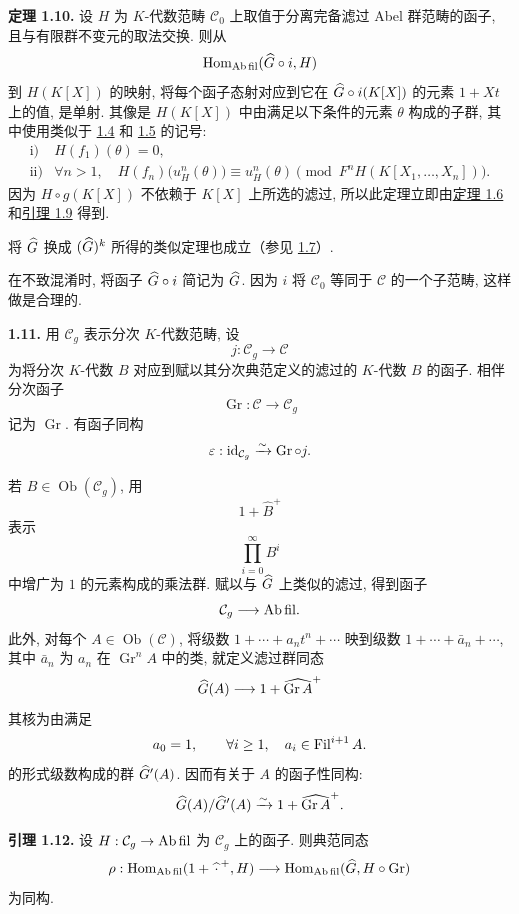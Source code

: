 \textbf{定理 1.10.} 设 \(H\) 为 \(K\)-代数范畴 \(\mathcal C_0\) 上取值于分离完备滤过 Abel 群范畴的函子, 且与有限群不变元的取法交换. 则从
\[
  \operatorname{Hom}_{\mathrm{Ab\,fil}}(\widehat G\circ i,H)
\]
到 \(H(K[X])\) 的映射, 将每个函子态射对应到它在 \(\widehat G\circ i(K[X])\) 的元素 \(1+Xt\) 上的值, 是单射. 其像是 \(H(K[X])\) 中由满足以下条件的元素 \(\theta\) 构成的子群, 其中使用类似于 \hyperlink{sga6.e05.para.1-4}{1.4} 和 \hyperlink{sga6.e05.para.1-5}{1.5} 的记号:
\[
\begin{array}{ll}
\text{i)}& H(f_1)(\theta)=0,\\[0.3em]
\text{ii)}& \forall n>1,\quad
 H(f_n)\bigl(u_H^n(\theta)\bigr)\equiv u_H^n(\theta)
 \pmod{F^nH(K[X_1,\ldots,X_n])}.
\end{array}
\]
因为 \(H\circ g(K[X])\) 不依赖于 \(K[X]\) 上所选的滤过, 所以此定理立即由\hyperlink{sga6.e05.thm.1-6}{定理 1.6} 和\hyperlink{sga6.e05.lem.1-9}{引理 1.9} 得到.

将 \(\widehat G\) 换成 \((\widehat G)^k\) 所得的类似定理也成立（参见 \hyperlink{sga6.e05.para.1-7}{1.7}）.

在不致混淆时, 将函子 \(\widehat G\circ i\) 简记为 \(\widehat G\). 因为 \(i\) 将 \(\mathcal C_0\) 等同于 \(\mathcal C\) 的一个子范畴, 这样做是合理的.

\textbf{1.11.} 用 \(\mathcal C_g\) 表示分次 \(K\)-代数范畴, 设
\[
  j:\mathcal C_g\longrightarrow\mathcal C
\]
为将分次 \(K\)-代数 \(B\) 对应到赋以其分次典范定义的滤过的 \(K\)-代数 \(B\) 的函子. 相伴分次函子
\[
  \operatorname{Gr}:\mathcal C\longrightarrow \mathcal C_g
\]
记为 \(\operatorname{Gr}\). 有函子同构
\[
  \varepsilon:\operatorname{id}_{\mathcal C_g}\xrightarrow{\sim}\operatorname{Gr}\circ j.
\]

若 \(B\in\operatorname{Ob}(\mathcal C_g)\), 用
\[
  1+\widehat{B}^{+}
\]
表示
\[
  \prod_{i=0}^{\infty}B^i
\]
中增广为 \(1\) 的元素构成的乘法群. 赋以与 \(\widehat G\) 上类似的滤过, 得到函子
\[
  \mathcal C_g\longrightarrow\mathrm{Ab\,fil}.
\]
此外, 对每个 \(A\in\operatorname{Ob}(\mathcal C)\), 将级数 \(1+\cdots+a_nt^n+\cdots\) 映到级数 \(1+\cdots+\bar a_n+\cdots\), 其中 \(\bar a_n\) 为 \(a_n\) 在 \(\operatorname{Gr}^nA\) 中的类, 就定义滤过群同态
\[
  \widehat G(A)\longrightarrow 1+\widehat{\operatorname{Gr}A}^{+}
\]
其核为由满足
\[
  a_0=1,\qquad \forall i\geq 1,\quad a_i\in\operatorname{Fil}^{i+1}A.
\]
的形式级数构成的群 \(\widehat G'(A)\). 因而有关于 \(A\) 的函子性同构:
\[
  \widehat G(A)/\widehat G'(A)\xrightarrow{\sim} 1+\widehat{\operatorname{Gr}A}^{+}.
\]

\textbf{引理 1.12.} 设 \(H:\mathcal C_g\to\mathrm{Ab\,fil}\) 为 \(\mathcal C_g\) 上的函子. 则典范同态
\[
  \rho:\operatorname{Hom}_{\mathrm{Ab\,fil}}(1+\widehat{\,\cdot\,}^{+},H)
  \longrightarrow
  \operatorname{Hom}_{\mathrm{Ab\,fil}}(\widehat G,H\circ\operatorname{Gr})
\]
为同构.

